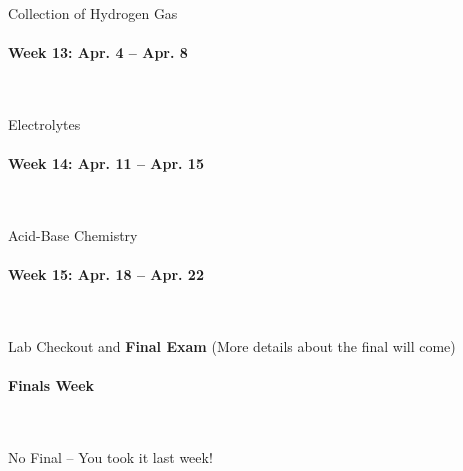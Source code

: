 \documentclass[12pt, letterpaper]{article}
\begin{document}
Collection of Hydrogen Gas

\paragraph{Week 13: Apr. 4 -- Apr. 8}~

Electrolytes

\paragraph{Week 14: Apr. 11 -- Apr. 15}~

Acid-Base Chemistry

\paragraph{Week 15: Apr. 18 -- Apr. 22}~

Lab Checkout and \textbf{Final Exam} (More details about the final will come)

\paragraph{Finals Week}~

No Final -- You took it last week!
\end{document}
